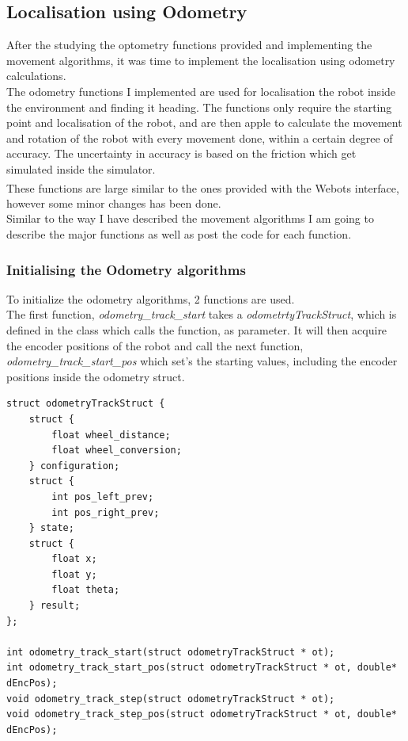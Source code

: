 \documentclass[10pt,a4paper]{article}
\begin{document}
\begin{flushleft}
\subsection{Localisation using Odometry}
After the studying the optometry functions provided and implementing the movement algorithms, it was time to implement the localisation using odometry calculations.\\
The odometry functions I implemented are used for localisation the robot inside the environment and finding it heading. The functions only require the starting point and localisation of the robot, and are then apple to calculate the movement and rotation of the robot with every movement done, within a certain degree of accuracy. The uncertainty in accuracy is based on the friction which get simulated inside the simulator. \\
These functions are large similar to the ones provided with the Webots\textsuperscript{\texttrademark} interface, however some minor changes has been done. \\
Similar to the way I have described the movement algorithms I am going to describe the major functions as well as post the code for each function.\\

\subsubsection{Initialising the Odometry algorithms}
To initialize the odometry algorithms, 2 functions are used. \\
The first function, \textit{odometry\_track\_start} takes a \textit{odometrtyTrackStruct}, which is defined in the class which calls the function, as parameter. It will then acquire the encoder positions of the robot and call the next function, \textit{odometry\_track\_start\_pos} which set's the starting values, including the encoder positions inside the odometry struct.\\
\begin{lstlisting}
struct odometryTrackStruct {
	struct {
		float wheel_distance;
		float wheel_conversion;
	} configuration;
	struct {
		int pos_left_prev;
		int pos_right_prev;
	} state;
	struct {
		float x;
		float y;
		float theta;
	} result;
};
 
int odometry_track_start(struct odometryTrackStruct * ot);
int odometry_track_start_pos(struct odometryTrackStruct * ot, double* dEncPos);
void odometry_track_step(struct odometryTrackStruct * ot);
void odometry_track_step_pos(struct odometryTrackStruct * ot, double* dEncPos);
\end{lstlisting}


\end{flushleft}
\end{document}
